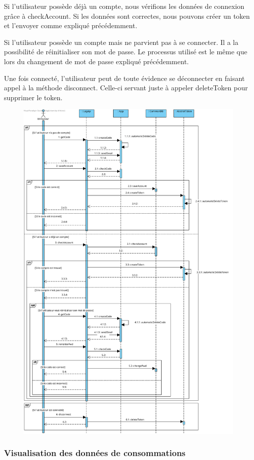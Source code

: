 \begin{flushleft}
Si l'utilisateur possède déjà un compte, nous vérifions les données de connexion grâce à checkAccount. Si les données sont correctes, nous pouvons créer un token et l'envoyer comme expliqué précédemment.
\end{flushleft}

\begin{flushleft}
Si l'utilisateur possède un compte mais ne parvient pas à se connecter. Il a la possibilité de réinitialiser son mot de passe. Le processus utilisé est le même que lors du changement de mot de passe expliqué précédemment.
\end{flushleft}

\begin{flushleft}
Une fois connecté, l'utilisateur peut de toute évidence se déconnecter en faisant appel à la méthode disconnect. Celle-ci servant juste à appeler deleteToken pour supprimer le token.
\end{flushleft}

\newpage
\begin{figure}[h]
\centering
\includegraphics[height = 1\textwidth]{Base/sequence/img/common/S'authentifier.png}
\end{figure}

\newpage
\subsubsection{Visualisation des données de consommations}


